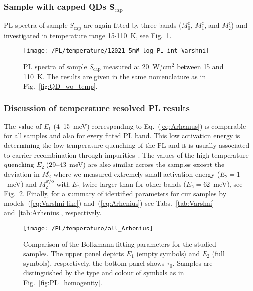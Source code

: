 \newpage
\subsubsection*{Sample with capped QDs $\mathbf{S_\mathrm{cap}}$}
%
PL spectra of sample ${S_\mathrm{cap}}$ are again fitted by three bands ($M_0^\mathrm{c}$, $M_1^\mathrm{c}$, and $M_2^\mathrm{c}$) and investigated in temperature range 15-110~K, see Fig.~\ref{fig:QD_c_temp}.
%
\begin{figure}[h]
	\centering
	\texttt{[image: /PL/temperature/12021\_5mW\_log\_PL\_int\_Varshni]}
	\caption{PL spectra of sample ${S_\mathrm{cap}}$ measured at 20~W/cm$^2$ between 15 and 110~K. The results are given in the same nomenclature as in Fig.~\ref{fig:QD_wo_temp}.}
	\label{fig:QD_c_temp}
\end{figure}

\newpage
\subsubsection*{Discussion of temperature resolved PL results}
%
The value of $E_1$ (4--15~meV) corresponding to Eq.~(\ref{eq:Arhenius}) is comparable for all samples and also for every fitted PL band. This low activation energy is determining the low-temperature quenching of the PL and it is usually associated to carrier recombination through impurities~\cite{YuCardona}. The values of the high-temperature quenching $E_2$ (29--43~meV) are also similar across the samples except the deviation in $M_2^\mathrm{c}$ where we measured extremely small activation energy ($E_2=1$~meV) and $M_2^\mathrm{w/o}$ with $E_2$ twice larger than for other bands ($E_2=62$~meV), see Fig.~\ref{fig:Arrhenius_all}. Finally, for a summary of identified parameters for our samples by models~(\ref{eq:Varshni-like}) and~(\ref{eq:Arhenius}) see Tabs.~\ref{tab:Varshni} and~\ref{tab:Arhenius}, respectively.

\begin{figure}
	\centering
	\texttt{[image: /PL/temperature/all\_Arhenius]}
	\caption{Comparison of the Boltzmann fitting parameters for the studied samples. The upper panel depicts $E_1$ (empty symbols) and $E_2$ (full symbols), respectively, the bottom panel shows $\tau_0$. Samples are distinguished by the type and colour of symbols as in Fig.~\ref{fig:PL_homogenity}.}
	\label{fig:Arrhenius_all}
\end{figure}


